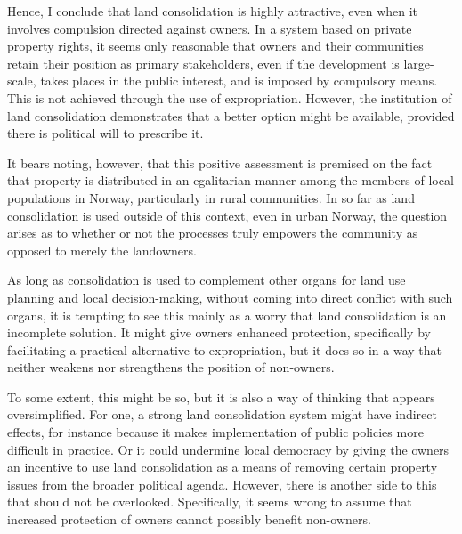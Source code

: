 Hence, I conclude that land consolidation is highly attractive, even when it involves compulsion directed against owners. In a system based on private property rights, it seems only reasonable that owners and their communities retain their position as primary stakeholders, even if the development is large-scale, takes places in the public interest, and is imposed by compulsory means. This is not achieved through the use of expropriation. However, the institution of land consolidation demonstrates that a better option might be available, provided there is political will to prescribe it. 

 
It bears noting, however, that this positive assessment is premised on the fact that property is distributed in an egalitarian manner among the members of local populations in Norway, particularly in rural communities. In so far as land consolidation is used outside of this context, even in urban Norway, the question arises as to whether or not the processes truly empowers the community as opposed to merely the landowners.

As long as consolidation is used to complement other organs for land use planning and local decision-making, without coming into direct conflict with such organs, it is tempting to see this mainly as a worry that land consolidation is an incomplete solution. It might give owners enhanced protection, specifically by facilitating a practical alternative to expropriation, but it does so in a way that neither weakens nor strengthens the position of non-owners. 

To some extent, this might be so, but it is also a way of thinking that appears oversimplified. For one, a strong land consolidation system might have indirect effects, for instance because it makes implementation of public policies more difficult in practice. Or it could undermine local democracy by giving the owners an incentive to use land consolidation as a means of removing certain property issues from the broader political agenda. However, there is another side to this that should not be overlooked. Specifically, it seems wrong to assume that increased protection of owners cannot possibly benefit non-owners. 

